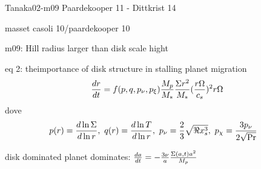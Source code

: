\begin{workout}
	Tanaka02-m09
	Paardekooper 11 - Dittkrist 14
\end{workout}

\begin{workout}
	masset casoli 10/paardekooper 10
\end{workout}

\begin{workout}
	m09: Hill radius larger than disk scale hight
\end{workout}

\begin{workout}
	eq 2: theimportance of disk structure in stalling planet migration
	\begin{equation}
	\TDy{t}{r}=f(p,q,p_{\nu},p_{\xi})\frac{M_p}{M_*}\frac{\Sigma r^2}{M_*}(\frac{r\Omega}{c_s})^2r\Omega
	\end{equation}
	dove
	\begin{align}
	&p(r)=\TDly{r}{\Sigma},\ q(r)=\TDly{r}{T},\ p_{\nu}=\frac{2}{3}\sqrt{\Re x_s^3},\ p_{\chi}=\frac{3p_{\nu}}{2\sqrt{\Pr}}
	\end{align}
\end{workout}

\begin{workout}
	disk dominated
	planet dominates: $\TDy{t}{a}=-\frac{3\nu}{a}\frac{\Sigma(a,t)a^2}{M_p}$
\end{workout}

